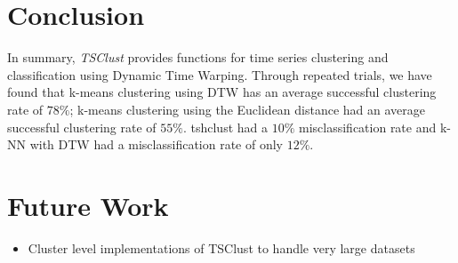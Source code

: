 \documentclass{article}
\begin{document}
\section{Conclusion}

In summary, \textit{TSClust} provides functions for time series clustering 
and classification using Dynamic Time Warping.  Through repeated trials, we
have found that k-means clustering using DTW has an average successful clustering 
rate of $78\%$; k-means clustering using the Euclidean distance had an average 
successful clustering rate of $55\%$.  tshclust had a $10\%$ misclassification
rate and k-NN with DTW had a misclassification rate of only $12\%$.

\section{Future Work}

\begin{itemize}
  \item Cluster level implementations of TSClust to handle very large datasets
\end{itemize}

\printbibliography
\end{document}
